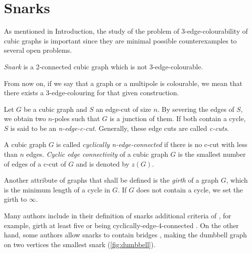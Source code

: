 \section{Snarks}\label{sec:snarks}

As mentioned in Introduction, the study of the problem of 3-edge-colourability of cubic graphs is important since they are minimal possible counterexamples to several open problems.



\begin{definition}\label{def:snark}
	\textit{Snark} is a 2-connected cubic graph which is not 3-edge-colourable.
\end{definition}

From now on, if we say that a graph or a multipole is colourable, we mean that there exists a 3-edge-colouring for that given construction.

Let $G$ be a cubic graph and $S$ an edge-cut of size $n$. By severing the edges of $S$, we obtain two $n$-poles such that $G$ is a junction of them. If both contain a cycle, $S$ is said to be an \textit{n-edge-c-cut}. Generally, these edge cuts are called \textit{c-cuts}. 

A cubic graph $G$ is called \textit{cyclically n-edge-connected} if there is no c-cut with less than $n$ edges. \textit{Cyclic edge connectivity} of a cubic graph $G$ is the smallest number of edges of a c-cut of $G$ and is denoted by $z(G)$.

Another attribute of graphs that shall be defined is the \textit{girth} of a graph $G$, which is the minimum length of a cycle in $G$. If $G$ does not contain a cycle, we set the girth to $\infty$.

Many authors include in their definition of snarks additional criteria of , for example, girth at least five or being cyclically-edge-4-connected \cite{Preissmann1983, Nedela1996}. On the other hand, some authors allow snarks to contain bridges \cite{IrreducibleSnarksSkoviera}, making the dumbbell graph on two vertices the smallest snark (\cref{fig:dumbbell}).

